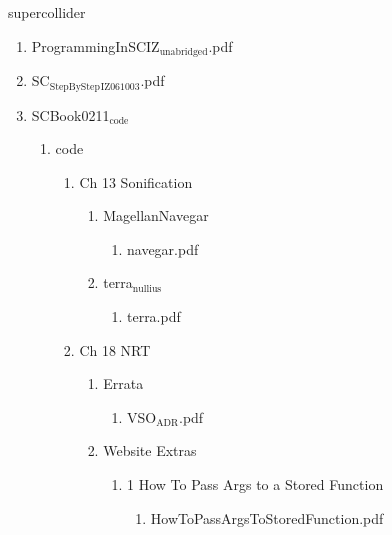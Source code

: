 \documentclass[11pt]{article}
\begin{document}
\item supercollider
\label{sec-1-1-1-1-46-13}
\begin{enumerate}
\item ProgrammingInSCIZ$_{\text{unabridged}}$.pdf
\label{sec-1-1-1-1-46-13-1}

\item SC$_{\text{StepByStep}}$$_{\text{IZ061003}}$.pdf
\label{sec-1-1-1-1-46-13-2}

\item SCBook0211$_{\text{code}}$
\label{sec-1-1-1-1-46-13-3}
\begin{enumerate}
\item code
\label{sec-1-1-1-1-46-13-3-1}
\begin{enumerate}
\item Ch 13 Sonification
\label{sec-1-1-1-1-46-13-3-1-1}
\begin{enumerate}
\item MagellanNavegar
\label{sec-1-1-1-1-46-13-3-1-1-1}
\begin{enumerate}
\item navegar.pdf
\label{sec-1-1-1-1-46-13-3-1-1-1-1}
\end{enumerate}

\item terra$_{\text{nullius}}$
\label{sec-1-1-1-1-46-13-3-1-1-2}
\begin{enumerate}
\item terra.pdf
\label{sec-1-1-1-1-46-13-3-1-1-2-1}
\end{enumerate}
\end{enumerate}

\item Ch 18 NRT
\label{sec-1-1-1-1-46-13-3-1-2}
\begin{enumerate}
\item Errata
\label{sec-1-1-1-1-46-13-3-1-2-1}
\begin{enumerate}
\item VSO$_{\text{ADR}}$.pdf
\label{sec-1-1-1-1-46-13-3-1-2-1-1}
\end{enumerate}

\item Website Extras
\label{sec-1-1-1-1-46-13-3-1-2-2}
\begin{enumerate}
\item 1 How To Pass Args to a Stored Function
\label{sec-1-1-1-1-46-13-3-1-2-2-1}
\begin{enumerate}
\item HowToPassArgsToStoredFunction.pdf
\label{sec-1-1-1-1-46-13-3-1-2-2-1-1}
\end{enumerate}


\end{enumerate}
\end{enumerate}
\end{enumerate}
\end{enumerate}
\end{enumerate}
\end{document}
